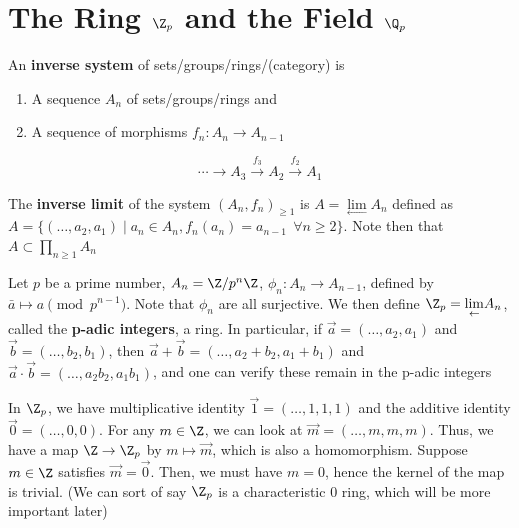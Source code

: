 
\section{\texorpdfstring{The Ring $\Z_p$ and the Field $\Q_p$}{The Ring Zp and the Field Qp}}

\begin{defn}
    An \textbf{inverse system} of sets/groups/rings/(category) is
    \begin{enumerate}
        \item[(i)] A sequence $A_n$ of sets/groups/rings and
        \item[(ii)] A sequence of morphisms
        $f_n:A_n\to {A_{n-1}}$
    \end{enumerate}
    $$\cdots \to A_3 \overset{f_3}{\to}A_2\overset{f_2}{\to}A_1$$
\end{defn}

\begin{defn}
    The \textbf{inverse limit} of the system $(A_n,f_n)_{\geq 1}$ is $A =\underset{\leftarrow}{\lim}A_n$ defined as $A=\{ (\dots,a_2,a_1) \mid a_n\in A_n,f_n(a_n)=a_{n-1} \:\: \forall n \geq 2 \}$. Note then that $A \subset \prod_{n\geq1}A_n$
\end{defn}

\begin{ex}
    Let $p$ be a prime number, $A_n= \Z/p^n\Z$, $\phi_n:A_n \to A_{n-1}$, defined by $\bar a \mapsto a \pmod {p^{n-1}}$. Note that $\phi_n$ are all surjective. We then define $\Z_p = \underset{\leftarrow}{\lim}A_n$, called the \textbf{p-adic integers}, a ring. In particular, if $\vec{a}=(\dots,a_2,a_1)$ and $\vec b=(\dots,b_2,b_1)$, then $\vec a + \vec b = (\dots,a_2+b_2,a_1+b_1)$ and $\vec a \cdot \vec b=(\dots,a_2b_2,a_1b_1)$, and one can verify these remain in the p-adic integers
\end{ex}

\begin{ex}
    In $\Z_p$, we have multiplicative identity $\vec 1 = (\dots,1,1,1)$ and the additive identity $\vec 0 =(\dots,0,0)$. For any $m\in \Z$, we can look at $\vec m=(\dots,m,m,m)$. Thus, we have a map $\Z \to \Z_p$ by $m \mapsto \vec m$, which is also a homomorphism. Suppose $m \in \Z$ satisfies $\vec m = \vec 0$. Then, we must have $m=0$, hence the kernel of the map is trivial. (We can sort of say $\Z_p$ is a characteristic $0$ ring, which will be more important later)
\end{ex}

